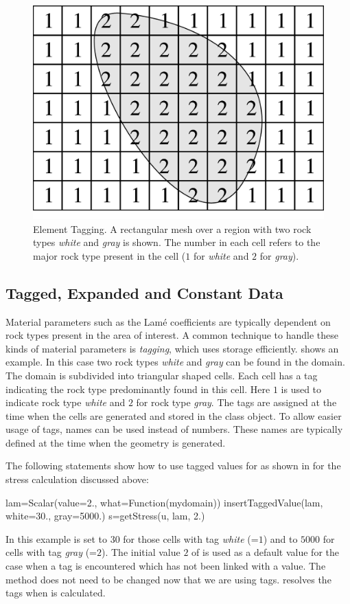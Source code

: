 \begin{figure}
\centering
\includegraphics{EscriptDiagram2}
\caption{\label{Figure: tag}Element Tagging. A rectangular mesh over a region
with two rock types {\it white} and {\it gray} is shown.
The number in each cell refers to the major rock type present in the cell
($1$ for {\it white} and $2$ for {\it gray}).}
\end{figure}

\subsection{Tagged, Expanded and Constant Data}
Material parameters such as the Lam\'e coefficients are typically dependent on
rock types present in the area of interest.
A common technique to handle these kinds of material parameters is
\emph{tagging}, which uses storage efficiently.
 shows an example. In this case two rock types {\it white}
and {\it gray} can be found in the domain.
The domain is subdivided into triangular shaped cells.
Each cell has a tag indicating the rock type predominantly found in this cell.
Here $1$ is used to indicate rock type {\it white} and $2$ for rock type {\it gray}.
The tags are assigned at the time when the cells are generated and stored in
the \Domain class object. To allow easier usage of tags, names can be used
instead of numbers. These names are typically defined at the time when the
geometry is generated.

The following statements show how to use tagged values for  as shown
in  for the stress calculation discussed above:
\begin{python}
  lam=Scalar(value=2., what=Function(mydomain))
  insertTaggedValue(lam, white=30., gray=5000.)
  s=getStress(u, lam, 2.)
\end{python}
In this example  is set to $30$ for those cells with tag {\it white}
(=$1$) and to $5000$ for cells with tag {\it gray} (=$2$).
The initial value $2$ of  is used as a default value for the case
when a tag is encountered which has not been linked with a value.
The  method does not need to be changed now that we are using tags.
\escript resolves the tags when  is calculated.

